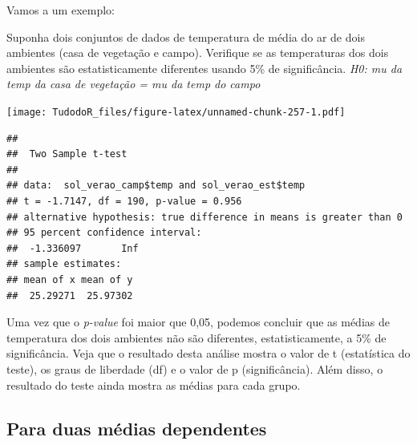\documentclass[
]{book}
\newenvironment{Shaded}{\begin{snugshade}}{\end{snugshade}}
\newcommand{\CommentTok}[1]{\textcolor[rgb]{0.56,0.35,0.01}{\textit{#1}}}
\newcommand{\DataTypeTok}[1]{\textcolor[rgb]{0.13,0.29,0.53}{#1}}
\newcommand{\KeywordTok}[1]{\textcolor[rgb]{0.13,0.29,0.53}{\textbf{#1}}}
\newcommand{\NormalTok}[1]{#1}
\newcommand{\OperatorTok}[1]{\textcolor[rgb]{0.81,0.36,0.00}{\textbf{#1}}}
\newcommand{\StringTok}[1]{\textcolor[rgb]{0.31,0.60,0.02}{#1}}
\begin{document}
Vamos a um exemplo:

Suponha dois conjuntos de dados de temperatura de média do ar de dois ambientes (casa de vegetação e campo). Verifique se as temperaturas dos dois ambientes são estatisticamente diferentes usando 5\% de significância.
\emph{H0: mu da temp da casa de vegetação = mu da temp do campo}

\begin{Shaded}
\end{Shaded}

\texttt{[image: TudodoR\_files/figure-latex/unnamed-chunk-257-1.pdf]}

\begin{Shaded}
\end{Shaded}

\begin{verbatim}
## 
##  Two Sample t-test
## 
## data:  sol_verao_camp$temp and sol_verao_est$temp
## t = -1.7147, df = 190, p-value = 0.956
## alternative hypothesis: true difference in means is greater than 0
## 95 percent confidence interval:
##  -1.336097       Inf
## sample estimates:
## mean of x mean of y 
##  25.29271  25.97302
\end{verbatim}

Uma vez que o \emph{p-value} foi maior que 0,05, podemos concluir que as médias de temperatura dos dois ambientes não são diferentes, estatisticamente, a 5\% de significância.
Veja que o resultado desta análise mostra o valor de t (estatística do teste), os graus de liberdade (df) e o valor de p (significância). Além disso, o resultado do teste ainda mostra as médias para cada grupo.

\hypertarget{para-duas-muxe9dias-dependentes}{%
\subsection{Para duas médias dependentes}\label{para-duas-muxe9dias-dependentes}}
\end{document}
